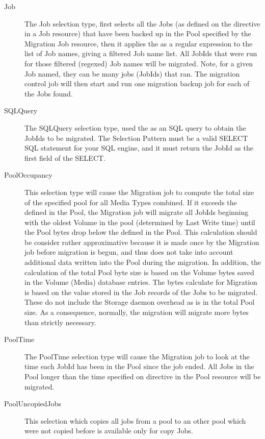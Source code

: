 {\begin{description}
  \item [Job] The Job selection type, first selects all the Jobs (as
        defined on the  directive in a Job resource)
        that have been backed up in the Pool specified by the Migration
        Job resource, then it applies the 
        as a regular expression to the list of Job names, giving
        a filtered Job name list.  All JobIds that were run for those
        filtered (regexed) Job names will be migrated.  Note, for a given
        Job named, they can be many jobs (JobIds) that ran.
        The migration control job will then start and run one migration
        backup job for each of the Jobs found.

  \item [SQLQuery] The SQLQuery selection type, used the 
        as an SQL query to obtain the JobIds to be migrated.
        The Selection Pattern must be a valid SELECT SQL statement for your
        SQL engine, and it must return the JobId as the first field
        of the SELECT.

  \item [PoolOccupancy] This selection type will cause the Migration job
        to compute the total size of the specified pool for all Media Types
        combined. If it exceeds the  
        defined in
        the Pool, the Migration job will migrate all JobIds beginning with
        the oldest Volume in the pool (determined by Last Write time) until
        the Pool bytes drop below the  
        defined in the
        Pool. This calculation should be consider rather approximative because
        it is made once by the Migration job before migration is begun, and
        thus does not take into account additional data written into the Pool
        during the migration.  In addition, the calculation of the total Pool
        byte size is based on the Volume bytes saved in the Volume (Media) database
        entries. The bytes calculate for Migration is based on the value stored
        in the Job records of the Jobs to be migrated. These do not include the
        Storage daemon overhead as is in the total Pool size. As a consequence,
        normally, the migration will migrate more bytes than strictly necessary.

  \item [PoolTime] The PoolTime selection type will cause the Migration job to
        look at the time each JobId has been in the Pool since the job ended.
        All Jobs in the Pool longer than the time specified on 
        directive in the Pool resource will be migrated.

  \item [PoolUncopiedJobs] This selection which copies all jobs from a pool
        to an other pool which were not copied before is available only for copy Jobs.

  \end{description}

}


